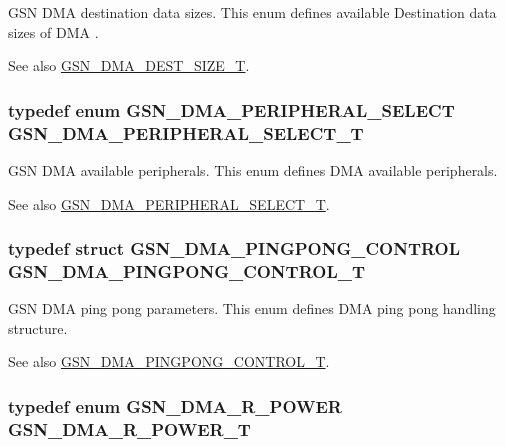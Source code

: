 GSN DMA destination data sizes. This enum defines available Destination data sizes of DMA . 

\begin{DoxySeeAlso}{See also}
\hyperlink{a00645_ga911fde9b2a20ed7759a9d2a8849e34f4}{GSN\_\-DMA\_\-DEST\_\-SIZE\_\-T}. 
\end{DoxySeeAlso}
\hypertarget{a00645_gab17cf1a2935d52f5490128aeddd1eb07}{
\subsubsection[{GSN\_\-DMA\_\-PERIPHERAL\_\-SELECT\_\-T}]{\setlength{\rightskip}{0pt plus 5cm}typedef enum {\bf GSN\_\-DMA\_\-PERIPHERAL\_\-SELECT}  {\bf GSN\_\-DMA\_\-PERIPHERAL\_\-SELECT\_\-T}}}
\label{a00645_gab17cf1a2935d52f5490128aeddd1eb07}


GSN DMA available peripherals. This enum defines DMA available peripherals. 

\begin{DoxySeeAlso}{See also}
\hyperlink{a00645_gab17cf1a2935d52f5490128aeddd1eb07}{GSN\_\-DMA\_\-PERIPHERAL\_\-SELECT\_\-T}. 
\end{DoxySeeAlso}
\hypertarget{a00645_gae146d7793ab9cfe1a37249ffc98ccf5d}{
\subsubsection[{GSN\_\-DMA\_\-PINGPONG\_\-CONTROL\_\-T}]{\setlength{\rightskip}{0pt plus 5cm}typedef struct {\bf GSN\_\-DMA\_\-PINGPONG\_\-CONTROL}  {\bf GSN\_\-DMA\_\-PINGPONG\_\-CONTROL\_\-T}}}
\label{a00645_gae146d7793ab9cfe1a37249ffc98ccf5d}


GSN DMA ping pong parameters. This enum defines DMA ping pong handling structure. 

\begin{DoxySeeAlso}{See also}
\hyperlink{a00645_gae146d7793ab9cfe1a37249ffc98ccf5d}{GSN\_\-DMA\_\-PINGPONG\_\-CONTROL\_\-T}. 
\end{DoxySeeAlso}
\hypertarget{a00645_gadf8a8e2066de9043a495c7764612c35f}{
\subsubsection[{GSN\_\-DMA\_\-R\_\-POWER\_\-T}]{\setlength{\rightskip}{0pt plus 5cm}typedef enum {\bf GSN\_\-DMA\_\-R\_\-POWER}  {\bf GSN\_\-DMA\_\-R\_\-POWER\_\-T}}}
\label{a00645_gadf8a8e2066de9043a495c7764612c35f}


